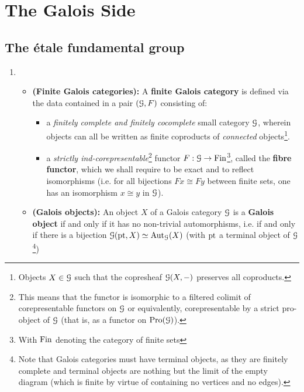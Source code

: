 \section{The Galois Side}
    \subsection{The \'etale fundamental group}
        \begin{definition} \label{def: finite_galois_categories}
            \noindent
            \begin{enumerate}
                \item 
                    \begin{itemize}
                        \item \textbf{(Finite Galois categories):} A \textbf{finite Galois category} is defined via the data contained in a pair $(\mathcal{G}, F)$ consisting of:
                        \begin{itemize}
                            \item a \textit{finitely complete and finitely cocomplete} small category $\mathcal{G}$, wherein objects can all be written as finite coproducts of \textit{connected} objects\footnote{Objects $X \in \mathcal{G}$ such that the copresheaf $\mathcal{G}(X, -)$ preserves all coproducts.}.
                            \item a \textit{strictly ind-corepresentable}\footnote{This means that the functor is isomorphic to a filtered colimit of corepresentable functors on $\mathcal{G}$ or equivalently, corepresentable by a strict pro-object of $\mathcal{G}$ (that is, as a functor on $\mathrm{Pro}(\mathcal{G})$).} functor $F: \mathcal{G} \to \mathrm{Fin}$\footnote{With $\mathrm{Fin}$ denoting the category of finite sets}, called the \textbf{fibre functor}, which we shall require to be exact and to reflect isomorphisms (i.e. for all bijections $Fx \cong Fy$ between finite sets, one has an isomorphism $x \cong y$ in $\mathcal{G}$).
                        \end{itemize}
                        \item \textbf{(Galois objects):} An object $X$ of a Galois category $\mathcal{G}$ is a \textbf{Galois object} if and only if it has no non-trivial automorphisms, i.e. if and only if there is a bijection $\mathcal{G}(\mathrm{pt}, X) \simeq \mathrm{Aut}_{\mathcal{G}}(X)$ (with $\mathrm{pt}$ a terminal object of $\mathcal{G}$\footnote{Note that Galois categories must have terminal objects, as they are finitely complete and terminal objects are nothing but the limit of the empty diagram (which is finite by virtue of containing no vertices and no edges).})

\end{itemize}
\end{enumerate}
\end{definition}
